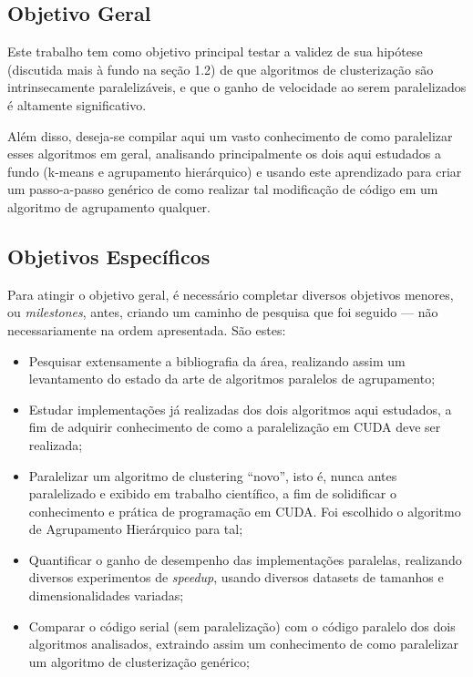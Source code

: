\documentclass[12pt,
openright, 
oneside, %
a4paper,    %
brazil]{facom-ufu-abntex2}
\def\qntAlgrtm{dois}
\begin{document}

\subsection{Objetivo Geral}

Este trabalho tem como objetivo principal testar a validez de sua hipótese (discutida mais à fundo na seção 1.2) de que algoritmos de clusterização são intrinsecamente paralelizáveis, e que o ganho de velocidade ao serem paralelizados é altamente significativo.

Além disso, deseja-se compilar aqui um vasto conhecimento de como paralelizar esses algoritmos em geral, analisando principalmente os \qntAlgrtm{} aqui estudados a fundo (k-means e agrupamento hierárquico) e usando este aprendizado para criar um passo-a-passo genérico de como realizar tal modificação de código em um algoritmo de agrupamento qualquer.




\subsection{Objetivos Específicos}

Para atingir o objetivo geral, é necessário completar diversos objetivos menores, ou \textit{milestones}, antes, criando um caminho de pesquisa que foi seguido --- não necessariamente na ordem apresentada. São estes:

\begin{itemize}
  \item Pesquisar extensamente a bibliografia da área, realizando assim um levantamento do estado da arte de algoritmos paralelos de agrupamento;
  
  \item Estudar implementações já realizadas dos \qntAlgrtm{} algoritmos aqui estudados, a fim de adquirir conhecimento de como a paralelização em CUDA deve ser realizada;
  
  \item Paralelizar um algoritmo de clustering \enquote{novo}, isto é, nunca antes paralelizado e exibido em trabalho científico, a fim de solidificar o conhecimento e prática de programação em CUDA. Foi escolhido o algoritmo de Agrupamento Hierárquico para tal;
  
  \item Quantificar o ganho de desempenho das implementações paralelas, realizando diversos experimentos de \textit{speedup}, usando diversos datasets de tamanhos e dimensionalidades variadas;
  
  \item Comparar o código serial (sem paralelização) com o código paralelo dos \qntAlgrtm{} algoritmos analisados, extraindo assim um conhecimento de como paralelizar um algoritmo de clusterização genérico;
\end{itemize}
\end{document}
